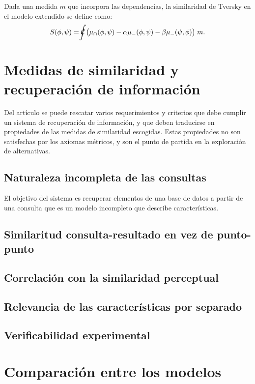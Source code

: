 \documentclass[spanish]{article}
\newcommand{\choquet}{\mathcal{C}\mspace{-18mu}\int}
\begin{document}
Dada una medida $m$ que incorpora las dependencias, la similaridad de Tversky en el modelo extendido
se define como:
\begin{equation}
    S(\phi, \psi) = \choquet\bigl(\mu_\cap (\phi, \psi) -
                            \alpha\mu_-  (\phi, \psi)   -
                            \beta \mu_-  (\psi, \phi)\bigr)\;m.
\end{equation}



\section{Medidas de similaridad y recuperación de información}
Del artículo se puede rescatar varios requerimientos y criterios que debe cumplir un sistema de
recuperación de información, y que deben traducirse en propiedades de las medidas de similaridad
escogidas.  Estas propiedades no son satisfechas por los axiomas métricos, y son el punto de partida
en la exploración de alternativas.

\subsection{Naturaleza incompleta de las consultas}
El objetivo del sistema es recuperar elementos de una base de datos a partir de una consulta que es
un modelo incompleto que describe características.  

\subsection{Similaritud consulta-resultado en vez de punto-punto}
\subsection{Correlación con la similaridad perceptual}
\subsection{Relevancia de las características por separado}
\subsection{Verificabilidad experimental}

\section{Comparación entre los modelos}
\end{document}
